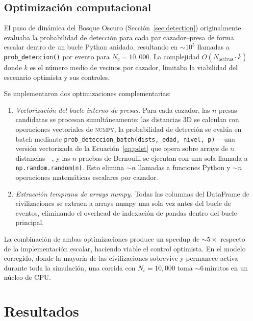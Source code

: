 \documentclass[useAMS,usenatbib,onecolumn]{mn2e}
\begin{document}
\subsection{Optimización computacional}
\label{sec:optimization}

El paso de dinámica del Bosque Oscuro (Sección~\ref{sec:detection})
originalmente evaluaba la probabilidad de detección para cada par
cazador--presa de forma escalar dentro de un bucle Python anidado,
resultando en $\sim 10^5$ llamadas a \texttt{prob\_deteccion()} por
evento para $N_c = 10{,}000$.
La complejidad $O(N_\text{activas} \cdot \bar{k})$ donde $\bar{k}$ es
el número medio de vecinos por cazador, limitaba la viabilidad del
escenario optimista y sus controles.

Se implementaron dos optimizaciones complementarias:
\begin{enumerate}
  \item \emph{Vectorización del bucle interno de presas.}
        Para cada cazador, las $n$ presas candidatas se procesan
        simultáneamente: las distancias 3D se calculan con operaciones
        vectoriales de \textsc{numpy}, la probabilidad de detección se
        evalúa en batch mediante \texttt{prob\_deteccion\_batch(dists,
        edad, nivel, p)} —una versión vectorizada de la
        Ecuación~\ref{eq:pdet} que opera sobre arrays de $n$ distancias—,
        y las $n$ pruebas de Bernoulli se ejecutan con una sola llamada a
        \texttt{np.random.random(n)}.
        Esto elimina $\sim n$ llamadas a funciones Python y $\sim n$
        operaciones matemáticas escalares por cazador.
  \item \emph{Extracción temprana de arrays numpy.}
        Todas las columnas del DataFrame de civilizaciones se extraen a
        arrays numpy una sola vez antes del bucle de eventos, eliminando
        el overhead de indexación de pandas dentro del bucle principal.
\end{enumerate}
La combinación de ambas optimizaciones produce un speedup de
$\sim 5\times$ respecto de la implementación escalar, haciendo viable
el control optimista.
En el modelo corregido, donde la mayoría de las civilizaciones
sobrevive y permanece activa durante toda la simulación, una corrida
con $N_c = 10{,}000$ toma $\sim 6$\,minutos en un núcleo de CPU.

\section{Resultados}
\label{sec:results}
\end{document}

